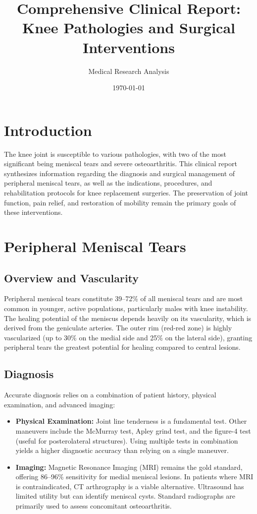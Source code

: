 \documentclass[12pt,a4paper]{article}
\title{\textbf{Comprehensive Clinical Report: Knee Pathologies and Surgical Interventions}}
\author{Medical Research Analysis}
\date{\today}
\begin{document}
\maketitle
\tableofcontents
\newpage

\section{Introduction}
The knee joint is susceptible to various pathologies, with two of the most significant being meniscal tears and severe osteoarthritis. This clinical report synthesizes information regarding the diagnosis and surgical management of peripheral meniscal tears, as well as the indications, procedures, and rehabilitation protocols for knee replacement surgeries. The preservation of joint function, pain relief, and restoration of mobility remain the primary goals of these interventions.

\section{Peripheral Meniscal Tears}
\subsection{Overview and Vascularity}
Peripheral meniscal tears constitute 39--72\% of all meniscal tears and are most common in younger, active populations, particularly males with knee instability. The healing potential of the meniscus depends heavily on its vascularity, which is derived from the geniculate arteries. The outer rim (red-red zone) is highly vascularized (up to 30\% on the medial side and 25\% on the lateral side), granting peripheral tears the greatest potential for healing compared to central lesions.

\subsection{Diagnosis}
Accurate diagnosis relies on a combination of patient history, physical examination, and advanced imaging:
\begin{itemize}
    \item \textbf{Physical Examination:} Joint line tenderness is a fundamental test. Other maneuvers include the McMurray test, Apley grind test, and the figure-4 test (useful for posterolateral structures). Using multiple tests in combination yields a higher diagnostic accuracy than relying on a single maneuver.
    \item \textbf{Imaging:} Magnetic Resonance Imaging (MRI) remains the gold standard, offering 86--96\% sensitivity for medial meniscal lesions. In patients where MRI is contraindicated, CT arthrography is a viable alternative. Ultrasound has limited utility but can identify meniscal cysts. Standard radiographs are primarily used to assess concomitant osteoarthritis.
\end{itemize}
\end{document}
